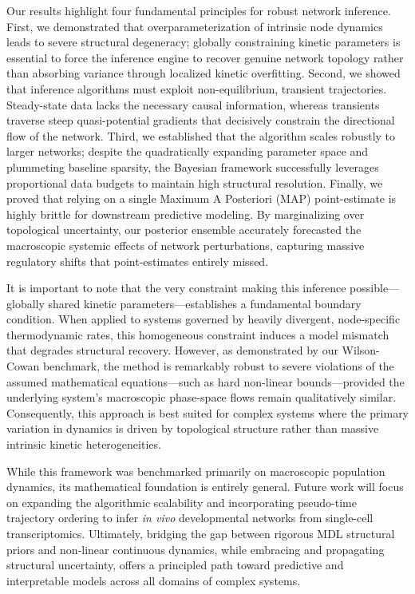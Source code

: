 \documentclass[10pt, aps, rmp,  twocolumn, superscriptaddress, floatfix, showkeys]{revtex4-2}
\begin{document}
Our results highlight four fundamental principles for robust network inference. First, we demonstrated that overparameterization of intrinsic node dynamics leads to severe structural degeneracy; globally constraining kinetic parameters is essential to force the inference engine to recover genuine network topology rather than absorbing variance through localized kinetic overfitting. Second, we showed that inference algorithms must exploit non-equilibrium, transient trajectories. Steady-state data lacks the necessary causal information, whereas transients traverse steep quasi-potential gradients that decisively constrain the directional flow of the network. Third, we established that the algorithm scales robustly to larger networks; despite the quadratically expanding parameter space and plummeting baseline sparsity, the Bayesian framework successfully leverages proportional data budgets to maintain high structural resolution. Finally, we proved that relying on a single Maximum A Posteriori (MAP) point-estimate is highly brittle for downstream predictive modeling. By marginalizing over topological uncertainty, our posterior ensemble accurately forecasted the macroscopic systemic effects of network perturbations, capturing massive regulatory shifts that point-estimates entirely missed.

It is important to note that the very constraint making this inference possible—globally shared kinetic parameters—establishes a fundamental boundary condition. When applied to systems governed by heavily divergent, node-specific thermodynamic rates, this homogeneous constraint induces a model mismatch that degrades structural recovery. However, as demonstrated by our Wilson-Cowan benchmark, the method is remarkably robust to severe violations of the assumed mathematical equations—such as hard non-linear bounds—provided the underlying system's macroscopic phase-space flows remain qualitatively similar. Consequently, this approach is best suited for complex systems where the primary variation in dynamics is driven by topological structure rather than massive intrinsic kinetic heterogeneities. 

While this framework was benchmarked primarily on macroscopic population dynamics, its mathematical foundation is entirely general. Future work will focus on expanding the algorithmic scalability and incorporating pseudo-time trajectory ordering to infer \textit{in vivo} developmental networks from single-cell transcriptomics. Ultimately, bridging the gap between rigorous MDL structural priors and non-linear continuous dynamics, while embracing and propagating structural uncertainty, offers a principled path toward predictive and interpretable models across all domains of complex systems.
\end{document}
